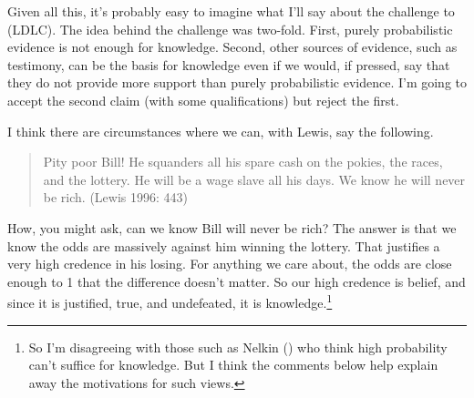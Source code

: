 \documentclass[
  10pt,
  letterpaper,
  DIV=11,
  numbers=noendperiod,
  twoside]{scrartcl}
\begin{document}
Given all this, it's probably easy to imagine what I'll say about the
challenge to (LDLC). The idea behind the challenge was two-fold. First,
purely probabilistic evidence is not enough for knowledge. Second, other
sources of evidence, such as testimony, can be the basis for knowledge
even if we would, if pressed, say that they do not provide more support
than purely probabilistic evidence. I'm going to accept the second claim
(with some qualifications) but reject the first.

I think there are circumstances where we can, with Lewis, say the
following.

\begin{quote}
Pity poor Bill! He squanders all his spare cash on the pokies, the
races, and the lottery. He will be a wage slave all his days. We know he
will never be rich. (Lewis 1996: 443)
\end{quote}

How, you might ask, can we know Bill will never be rich? The answer is
that we know the odds are massively against him winning the lottery.
That justifies a very high credence in his losing. For anything we care
about, the odds are close enough to 1 that the difference doesn't
matter. So our high credence is belief, and since it is justified, true,
and undefeated, it is knowledge.\footnote{So I'm disagreeing with those
  such as Nelkin () who think high
  probability can't suffice for knowledge. But I think the comments
  below help explain away the motivations for such views.}
\end{document}
